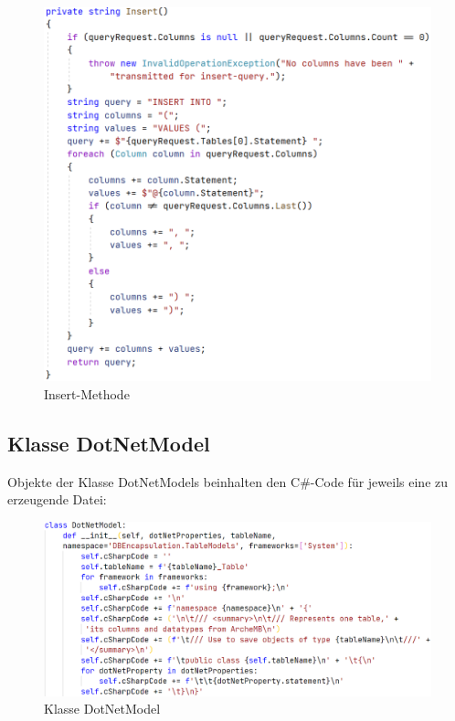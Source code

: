 \documentclass[11pt,toc=sectionentrywithoutdots, 
headheight=44pt, headings=optiontoheadandtoc, hyperfootnotes=false, hypertexnames=false]{scrartcl}
\begin{document}
 \begin{figure}[H]
 \centering

	\includegraphics[scale=0.7]{insert.PNG}
	 \caption{Insert-Methode}
 \end{figure}
 \clearpage
 
  \subsection{Klasse DotNetModel}
Objekte der Klasse DotNetModels beinhalten den C\#-Code für jeweils eine zu erzeugende Datei:
 \label{fig:DotNetModel}

 \begin{figure}[H]
 \centering

	\includegraphics[scale=0.55]{dotNetModel.PNG}
	 \caption{Klasse DotNetModel}
 \end{figure}
 \clearpage
 
\end{document}
